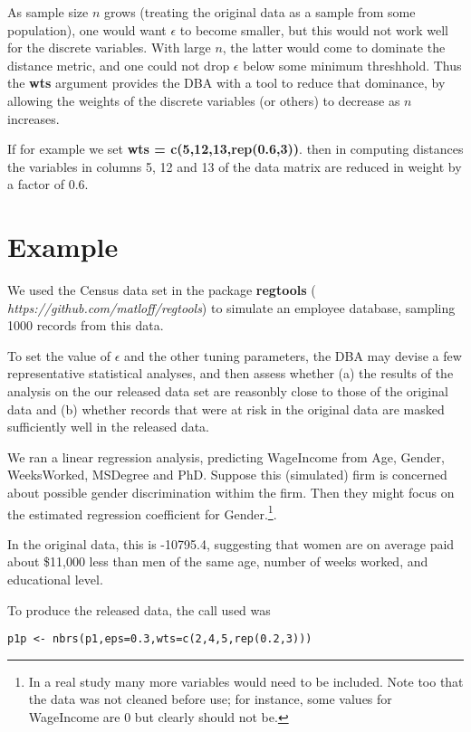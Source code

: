 \documentclass[11pt]{article}
\begin{document}
As sample size $n$ grows (treating the original data as a sample from
some population), one would want $\epsilon$ to become smaller, but this
would not work well for the discrete variables.  With large $n$, the
latter would come to dominate the distance metric, and one could not
drop $\epsilon$ below some minimum threshhold.  Thus the {\bf wts}
argument provides the DBA with a tool to reduce that dominance, by
allowing the weights of the discrete variables (or others) to decrease
as $n$ increases.

If for example we set {\bf wts = c(5,12,13,rep(0.6,3))}. then in
computing distances the variables in columns 5, 12 and 13 of the data
matrix are reduced in weight by a factor of 0.6.  

\section{Example}

We used the Census data set in the package {\bf regtools} ({\it
https://github.com/matloff/regtools}) to simulate an employee
database, sampling 1000 records from this data.

To set the value of $\epsilon$ and the other tuning parameters, the DBA
may devise a few representative statistical analyses, and then assess
whether (a) the results of the analysis on the our released data set are
reasonbly close to those of the original data and (b) whether records
that were at risk in the original data are masked sufficiently well in
the released data.
 
We ran a linear regression analysis, predicting WageIncome from Age,
Gender, WeeksWorked, MSDegree and PhD.  Suppose this (simulated) firm is
concerned about possible gender discrimination withim the firm. Then
they might focus on the estimated regression coefficient for
Gender.\footnote{In a real study many more variables would
need to be included.  Note too that the data was not cleaned before use;
for instance, some values for WageIncome are 0 but
clearly should not be.}.


In the original data, this is -10795.4, suggesting that women are on
average paid about \$11,000 less than men of the same age, number of
weeks worked, and educational level. 

To produce the released data, the call used was

\begin{lstlisting}
p1p <- nbrs(p1,eps=0.3,wts=c(2,4,5,rep(0.2,3)))
\end{lstlisting}
\end{document}
